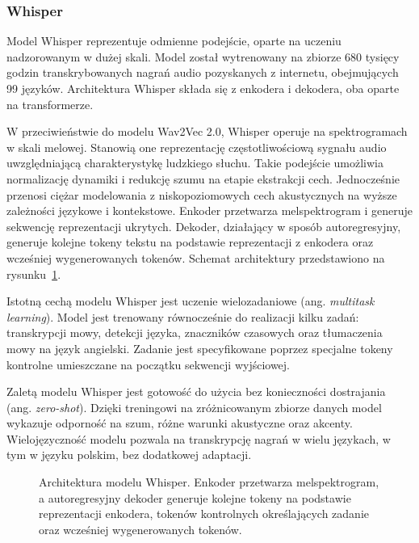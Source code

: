 \subsubsection{Whisper}

Model Whisper \cite{whisper} reprezentuje odmienne podejście, oparte na uczeniu nadzorowanym w dużej skali. Model został wytrenowany na zbiorze 680 tysięcy godzin transkrybowanych nagrań audio pozyskanych z internetu, obejmujących 99 języków. Architektura Whisper składa się z enkodera i dekodera, oba oparte na transformerze.

W przeciwieństwie do modelu Wav2Vec 2.0, Whisper operuje na spektrogramach w skali melowej. Stanowią one reprezentację częstotliwościową sygnału audio uwzględniającą charakterystykę ludzkiego słuchu. Takie podejście umożliwia normalizację dynamiki i redukcję szumu na etapie ekstrakcji cech. Jednocześnie przenosi ciężar modelowania z niskopoziomowych cech akustycznych na wyższe zależności językowe i kontekstowe. Enkoder przetwarza melspektrogram i generuje sekwencję reprezentacji ukrytych. Dekoder, działający w sposób autoregresyjny, generuje kolejne tokeny tekstu na podstawie reprezentacji z enkodera oraz wcześniej wygenerowanych tokenów. Schemat architektury przedstawiono na rysunku~\ref{fig:whisperArchitecture}.

Istotną cechą modelu Whisper jest uczenie wielozadaniowe (ang. \textit{multitask learning}). Model jest trenowany równocześnie do realizacji kilku zadań: transkrypcji mowy, detekcji języka, znaczników czasowych oraz tłumaczenia mowy na język angielski. Zadanie jest specyfikowane poprzez specjalne tokeny kontrolne umieszczane na początku sekwencji wyjściowej.

Zaletą modelu Whisper jest gotowość do użycia bez konieczności dostrajania (ang. \textit{zero-shot}). Dzięki treningowi na zróżnicowanym zbiorze danych model wykazuje odporność na szum, różne warunki akustyczne oraz akcenty. Wielojęzyczność modelu pozwala na transkrypcję nagrań w wielu językach, w tym w języku polskim, bez dodatkowej adaptacji.

\begin{figure}[htbp]
    \centering
    \caption{Architektura modelu Whisper. Enkoder przetwarza melspektrogram, a autoregresyjny dekoder generuje kolejne tokeny na podstawie reprezentacji enkodera, tokenów kontrolnych określających zadanie oraz wcześniej wygenerowanych tokenów.}
    \label{fig:whisperArchitecture}
\end{figure}

